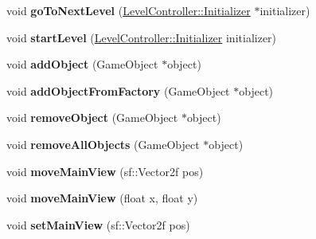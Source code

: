 \begin{DoxyCompactItemize}
\item 
\hypertarget{class_level_controller_a9cb1f95fee01739d9658801dfebb43b1}{void {\bfseries go\-To\-Next\-Level} (\hyperlink{class_level_controller_1_1_initializer}{Level\-Controller\-::\-Initializer} $\ast$initializer)}\label{class_level_controller_a9cb1f95fee01739d9658801dfebb43b1}

\item 
\hypertarget{class_level_controller_a0b8f10e66f7b97615c92340e10f77a07}{void {\bfseries start\-Level} (\hyperlink{class_level_controller_1_1_initializer}{Level\-Controller\-::\-Initializer} initializer)}\label{class_level_controller_a0b8f10e66f7b97615c92340e10f77a07}

\item 
\hypertarget{class_level_controller_a230987fb618cc9949974a4f4b994bbc1}{void {\bfseries add\-Object} (Game\-Object $\ast$object)}\label{class_level_controller_a230987fb618cc9949974a4f4b994bbc1}

\item 
\hypertarget{class_level_controller_afd60c294955bc06dafac9f5ea146c53d}{void {\bfseries add\-Object\-From\-Factory} (Game\-Object $\ast$object)}\label{class_level_controller_afd60c294955bc06dafac9f5ea146c53d}

\item 
\hypertarget{class_level_controller_ad8894683730d484c0ba359c0ee88b219}{void {\bfseries remove\-Object} (Game\-Object $\ast$object)}\label{class_level_controller_ad8894683730d484c0ba359c0ee88b219}

\item 
\hypertarget{class_level_controller_a3f33f48f2476ad4a68ad5880ea02db22}{void {\bfseries remove\-All\-Objects} (Game\-Object $\ast$object)}\label{class_level_controller_a3f33f48f2476ad4a68ad5880ea02db22}

\item 
\hypertarget{class_level_controller_abd5d6b2ae138b8e086e890fddf46ccef}{void {\bfseries move\-Main\-View} (sf\-::\-Vector2f pos)}\label{class_level_controller_abd5d6b2ae138b8e086e890fddf46ccef}

\item 
\hypertarget{class_level_controller_a02c383a82a966cb4c0a53d571e771016}{void {\bfseries move\-Main\-View} (float x, float y)}\label{class_level_controller_a02c383a82a966cb4c0a53d571e771016}

\item 
\hypertarget{class_level_controller_a18cdb3e6d6f3d6e9dde4de2c21bc99cf}{void {\bfseries set\-Main\-View} (sf\-::\-Vector2f pos)}\label{class_level_controller_a18cdb3e6d6f3d6e9dde4de2c21bc99cf}


\end{DoxyCompactItemize}
